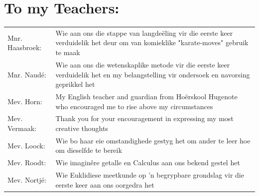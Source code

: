 \documentclass[12pt, oneside]{book}
\begin{document}
\section*{To my Teachers:}
%

\begin{flushleft}

\begin{table}[h]
\begin{tabularx}{\textwidth}{l X}
Mnr. Haasbroek: & Wie aan ons die stappe van langde{\"e}ling vir die eerste keer verduidelik het deur om van komieklike "karate-moves" gebruik te maak \\[0.2cm]

Mnr. Naud{\'e}: & Wie aan ons die wetenskaplike metode vir die eerste keer verduidelik het en my belangstelling vir ondersoek en navorsing geprikkel het \\[0.2cm]

Mev. Horn: & My English teacher and guardian from Ho{\"e}rskool Hugenote who encouraged me to rise above my circumstances \\[0.2cm]

Mev. Vermaak: & Thank you for your encouragement in expressing my most creative thoughts \\[0.2cm]

Mev. Loock: & Wie bo haar eie omstandighede gestyg het om ander te leer hoe om dieselfde te bereik \\[0.2cm]

Mev. Roodt: & Wie imagin{\^e}re getalle en Calculus aan ons bekend gestel het  \\[0.2cm]

Mev. Nortj{\'e}: & Wie Euklidiese meetkunde op 'n begrypbare grondslag vir die eerste keer aan ons oorgedra het  \\[0.2cm]

\end{tabularx}
\end{table}

\end{flushleft}
\end{document}
